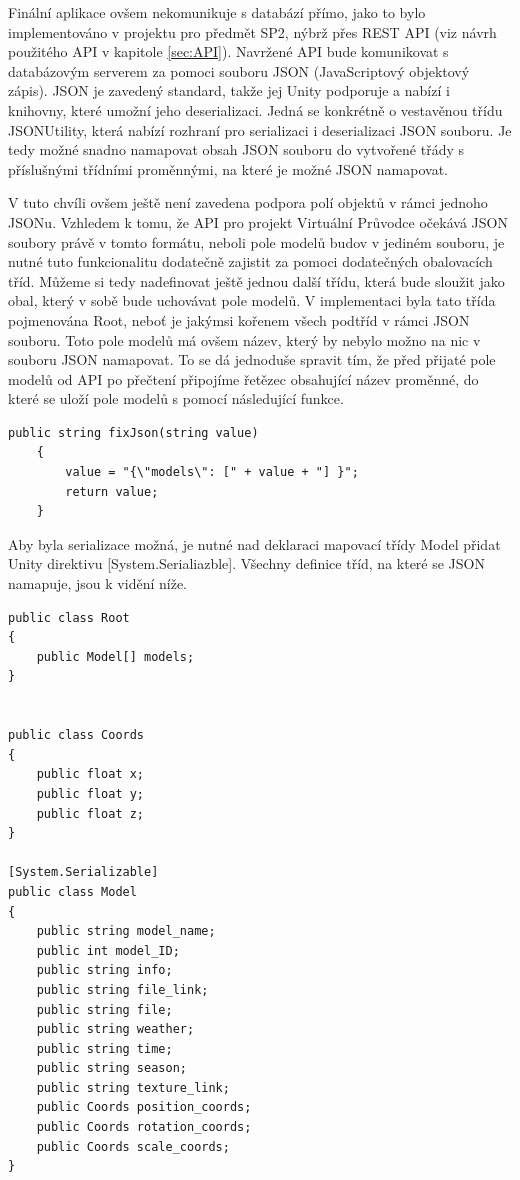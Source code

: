 \documentclass[thesis=B,czech]{FITthesis}[2012/06/26]
\begin{document}
	Finální aplikace ovšem nekomunikuje s databází přímo, jako to bylo implementováno v projektu pro předmět SP2, nýbrž přes REST API (viz návrh použitého API v kapitole \ref{sec:API}). Navržené API bude komunikovat s databázovým serverem za pomoci souboru JSON (JavaScriptový objektový zápis). JSON je zavedený standard, takže jej Unity podporuje a nabízí i knihovny, které umožní jeho deserializaci. Jedná se konkrétně o vestavěnou třídu JSONUtility, která nabízí rozhraní pro serializaci i deserializaci JSON souboru. Je tedy možné snadno namapovat obsah JSON souboru do vytvořené třády s příslušnými třídními proměnnými, na které je možné JSON namapovat. \cite{UnityJSON}

V tuto chvíli ovšem ještě není zavedena podpora polí objektů v rámci jednoho JSONu. \cite{UnityJSON} Vzhledem k tomu, že API pro projekt Virtuální Průvodce očekává JSON soubory právě v tomto formátu, neboli pole modelů budov v jediném souboru, je nutné tuto funkcionalitu dodatečně zajistit za pomoci dodatečných obalovacích tříd. Můžeme si tedy nadefinovat ještě jednou další třídu, která bude sloužit jako obal, který v sobě bude uchovávat pole modelů. V implementaci byla tato třída pojmenována Root, neboť je jakýmsi kořenem všech podtříd v rámci JSON souboru. Toto pole modelů má ovšem název, který by nebylo možno na nic v souboru JSON namapovat. To se dá jednoduše spravit tím, že před přijaté pole modelů od API po přečtení připojíme řetězec obsahující název proměnné, do které se uloží pole modelů s pomocí následující funkce.

\begin{lstlisting}[frame=single]
public string fixJson(string value)
    {
        value = "{\"models\": [" + value + "] }";
        return value;
    }

\end{lstlisting}

Aby byla serializace možná, je nutné nad deklaraci mapovací třídy Model přidat Unity direktivu [System.Serialiazble]. Všechny definice tříd, na které se JSON namapuje, jsou k vidění níže. 

\begin{lstlisting}[frame=single]
public class Root
{
    public Model[] models;
}


public class Coords 
{
    public float x;
    public float y;
    public float z;
}

[System.Serializable]
public class Model
{
    public string model_name;
    public int model_ID;
    public string info;
    public string file_link;
    public string file;
    public string weather;
    public string time;
    public string season;
    public string texture_link;
    public Coords position_coords;
    public Coords rotation_coords;
    public Coords scale_coords;
}
\end{lstlisting}
\end{document}
